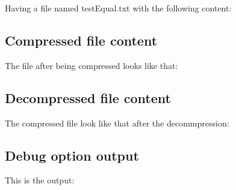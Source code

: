 Having a file named \textquotesingle{}test\+Equal.\+txt\textquotesingle{} with the following content\+: \hypertarget{index_three}{}\subsection{Compressed file content}\label{index_three}
The file after being compressed looks like that\+: \hypertarget{index_four}{}\subsection{Decompressed file content}\label{index_four}
The compressed file look like that after the decommpression\+: \hypertarget{index_five}{}\subsection{Debug option output}\label{index_five}
This is the output\+: 